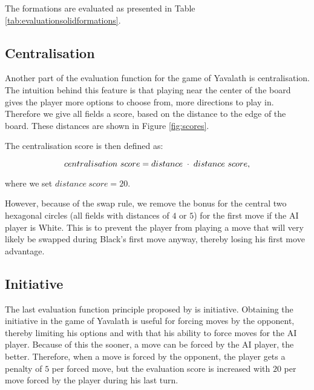 \documentclass[11pt]{article}
\begin{document}
The formations are evaluated as presented in Table \ref{tab:evaluationsolidformations}.



\subsection{Centralisation}
\label{-subsec:centralisation}
Another part of the evaluation function for the game of Yavalath is centralisation. The intuition behind this feature is that playing near the center of the board gives the player more options to choose from, \ie more directions to play in. Therefore we give all fields a score, based on the distance to the edge of the board. These distances are shown in Figure \ref{fig:scores}. 



The centralisation score is then defined as:

\begin{equation}
	centralisation\ score = distance \;\cdot\; distance\ score,
\end{equation}

where we set $distance\ score = 20$.

However, because of the swap rule, we remove the bonus for the central two hexagonal circles (all fields with distances of $4$ or $5$) for the first move if the AI player is White. This is to prevent the player from playing a move that will very likely be swapped during Black's first move anyway, thereby losing his first move advantage.

\subsection{Initiative}
\label{-subsec:initiative}
The last evaluation function principle proposed by \cite{Winands2004} is initiative. Obtaining the initiative in the game of Yavalath is useful for forcing moves by the opponent, thereby limiting his options and with that his ability to force moves for the AI player. Because of this the sooner, a move can be forced by the AI player, the better. Therefore, when a move is forced by the opponent, the player gets a penalty of $5$ per forced move, but the evaluation score is increased with $20$ per move forced by the player during his last turn.
\end{document}
